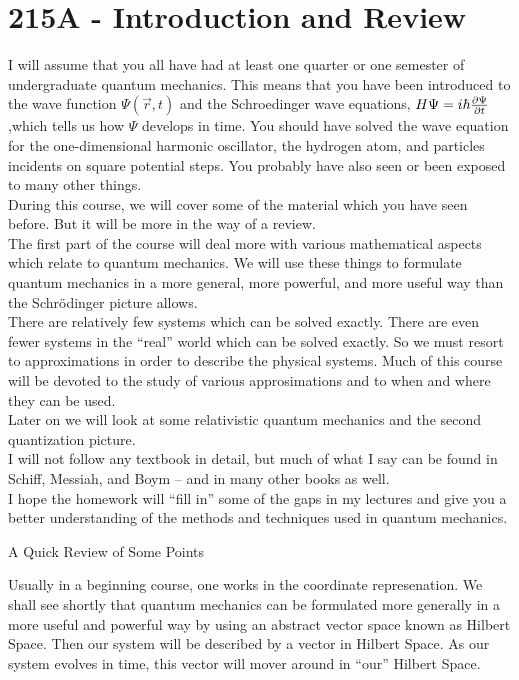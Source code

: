 \section{215A - Introduction and Review}

I will assume that you all have had at least one quarter or one semester of undergraduate quantum mechanics.
This means that you have been introduced to the wave function $\Psi(\vec r,t)$ and the Schroedinger wave equations, 
$H\Psi = i\hbar {\partial \Psi\over \partial t}$,which tells us how $\Psi$ develops in time. You should have solved the wave
equation for the one-dimensional harmonic oscillator, the hydrogen atom, and particles incidents on square potential steps.
You probably have also seen or been exposed to many other things.\\

During this course, we will cover some of the material which you have seen before. But it will be more in the way of a review.\\

The first part of the course will deal more with various mathematical aspects which relate to quantum mechanics. We will use these things to 
formulate quantum mechanics in a more general, more powerful, and more useful way than the Schr\"odinger picture allows.\\

There are relatively few systems which can be solved exactly. There are even fewer systems in the ``real'' world which can 
be solved exactly. So we must resort to approximations in order to describe the physical systems. Much of this course will 
be devoted to the study of various approsimations and to when and where they can be used. \\

Later on we will look at some relativistic quantum mechanics and the second quantization picture.\\ 

I will not follow any textbook in detail, but much of what I say can be found in Schiff, Messiah, and Boym -- and in many other books as well.\\

I hope the homework will ``fill in'' some of the gaps in my lectures and give you a better understanding of the methods and techniques used
in quantum mechanics.
 
 \centerline{A Quick Review of Some Points}
  
 Usually in a beginning course, one works in the coordinate represenation. We shall see shortly that quantum mechanics can be formulated more
 generally in a more useful and powerful way by using an abstract vector space known as Hilbert Space. Then our system will be described by a 
 vector in Hilbert Space. As our system evolves in time, this vector will mover around in ``our'' Hilbert Space. \\
 
